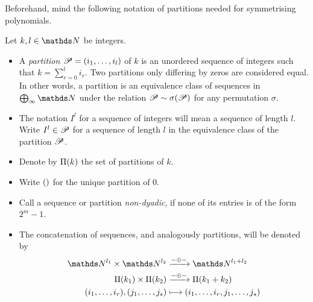 Beforehand, mind the following notation of partitions needed for
symmetrising polynomials.
\begin{Def}\label{def:partition}
  Let $k,l\in\Nat$ be integers.
  \begin{itemize}
  \item
    A \emph{partition} $\mathscr{P}=(i_1,\dotsc,i_l)$ of $k$ is an unordered sequence
    of integers such that $k=\sum_{r=0}^{l}i_r$.
    Two partitions only differing by zeros are considered equal.
    In other words, a partition is an equivalence class of sequences in
    $\bigoplus_\infty\Nat$ under the relation $\mathscr{P}\sim\sigma(\mathscr{P})$
    for any permutation $\sigma$.
  \item
    The notation $I^l$ for a sequence of integers will mean a sequence
    of length $l$. Write $I^l\in\mathscr{P}$ for a sequence of length
    $l$ in the equivalence class of the partition $\mathscr{P}$. 
  \item
    Denote by $\Pi({k})$ the set of partitions of $k$.
  \item
    Write $()$ for the unique partition of $0$.
  \item
    Call a sequence or partition \emph{non-dyadic}, if
    none of its entries is of the form $2^m-1$.
  \item The concatenation of sequences, and analogously partitions, will
    be denoted by
    \begin{align*}
      \Nat^{l_1} \times \Nat^{l_2}
      &\xrightarrow{-\concat-}
        \Nat^{l_1+l_2}
      \\
      \PartitionsOf{k_1} \times \PartitionsOf{k_2}
      &\xrightarrow{-\concat-}
        \PartitionsOf{k_1+k_2}
      \\
      (i_1,\dotsc,i_r), (j_1,\dotsc,j_s)
      &\longmapsto
        (i_1,\dotsc,i_r,j_1,\dotsc,j_s)
    \end{align*}
  \end{itemize}
\end{Def}

